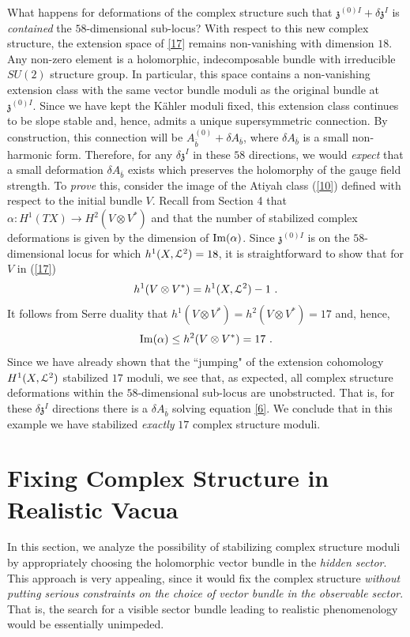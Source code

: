 \documentclass[12pt]{article}
\numberwithin{equation}{section}
\newcommand{\beq}{\begin{equation}}
\newcommand{\eeq}{\end{equation}}
\newcommand{\eref}[1]{(\ref{#1})}
\begin{document}
What happens for deformations of the complex structure such that ${\mathfrak{z}}^{(0)I}+\delta{\mathfrak{z}}^{I}$ is {\it contained} the $58$-dimensional sub-locus? With respect to this new complex structure, the extension space of \eqref{17} remains non-vanishing with dimension $18$. Any non-zero element is a holomorphic, indecomposable bundle with irreducible $SU(2)$ structure group. In particular, this space contains a non-vanishing extension class with the same vector bundle moduli as the original bundle at ${\mathfrak{z}}^{(0)I}$. Since we have kept the K\"ahler moduli fixed, this extension class continues to be slope stable and, hence, admits a unique supersymmetric connection. By construction, this connection will be $A^{(0)}_{\bar{b}}+\delta A_{\bar{b}}$, where $\delta A_{\bar{b}}$ is a small non-harmonic form. Therefore, for any $\delta{\mathfrak{z}}^{I}$ in these $58$ directions, we would 
{\it expect} that a small deformation $ \delta A_{\bar{b}}$ exists which preserves the holomorphy of the gauge field strength.
To {\it prove} this, consider the image of the Atiyah class \eref{10} defined with respect to the initial bundle $V$. Recall from Section 4 that $\alpha:H^1(TX) \to H^2(V\otimes V^*)$ and that the number of stabilized complex deformations is given by the dimension of ${\rm Im}(\alpha)$.
Since ${\mathfrak{z}}^{(0)I}$  is on the $58$-dimensional locus for which $h^1(X,{\cal L}^2)=18$, it is straightforward to show \cite{Anderson:2009nt,Anderson:2010tc} that for $V$ in \eref{17}
\beq
h^1(V\otimes V^*)=h^1(X,{\cal L}^2)-1 \ .
\label{22}
\eeq
It follows from Serre duality that $h^1(V\otimes V^*)=h^2(V\otimes V^*)=17$ and, hence,
\beq
{\rm Im}(\alpha) \leq h^2(V\otimes V^*)=17 \ .
\label{23}
\eeq
Since we have already shown that the ``jumping" of the extension cohomology $H^1(X,{\cal L}^2)$ stabilized $17$ moduli, we see that, as expected, all complex structure deformations within the 
$58$-dimensional sub-locus are unobstructed.
That is, for these $\delta{\mathfrak{z}}^{I}$ directions there is a $\delta A_{\bar{b}}$ solving equation \eqref{6}. 
We conclude that in this example we have stabilized {\it exactly} $17$ complex structure moduli.


\section{Fixing Complex Structure in Realistic Vacua}

In this section, we analyze the possibility of stabilizing complex structure moduli by appropriately choosing the holomorphic vector bundle in the {\it hidden sector}. This approach is very appealing, since it would fix the complex structure {\it without putting serious constraints on the choice of vector bundle in the observable sector}. That is, the search for a visible sector bundle leading to realistic phenomenology would be essentially unimpeded.
\end{document}
